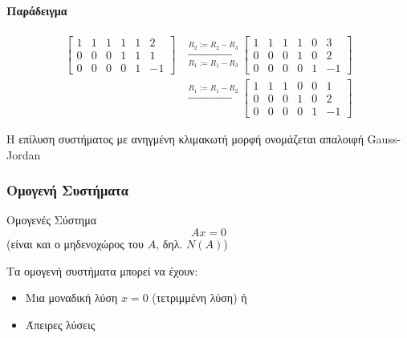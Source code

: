 \documentclass[11pt,a4paper,notitlepage,fleqn]{article}
\begin{document}
\begin{itemize}
	\paragraph{Παράδειγμα}
	\begin{align*}
		\left[\begin{array}{ccccc|c}
		1&1&1&1&1&2\\0&0&0&1&1&1\\0&0&0&0&1&-1
		\end{array}\right] &\xrightarrow[R_1:=R_1-R_3]{R_2:=R_2-R_3}
		\left[\begin{array}{ccccc|c}
		1&1&1&1&0&3\\0&0&0&1&0&2\\0&0&0&0&1&-1
		\end{array}\right] \\&\xrightarrow{R_1:=R_1-R_2}
		\left[\begin{array}{ccccc|c}
		1&1&1&0&0&1\\0&0&0&1&0&2\\0&0&0&0&1&-1
		\end{array}\right]
	\end{align*}
	
	Η επίλυση συστήματος με ανηγμένη κλιμακωτή μορφή ονομάζεται
	απαλοιφή Gauss-Jordan
	
	\subsubsection{Ομογενή Συστήματα}
	\begin{defn}{Ομογενές Σύστημα}{}
		\[
		Ax = 0
		\]
		(είναι και ο μηδενοχώρος του \( A \), δηλ. \( N(A) \))
	\end{defn}
	Τα ομογενή συστήματα μπορεί να έχουν:
	\begin{itemize}
		\item Μια μοναδική λύση \( x=0 \) (τετριμμένη λύση) ή
		\item Άπειρες λύσεις
	\end{itemize}
	

\end{itemize}
\end{document}
